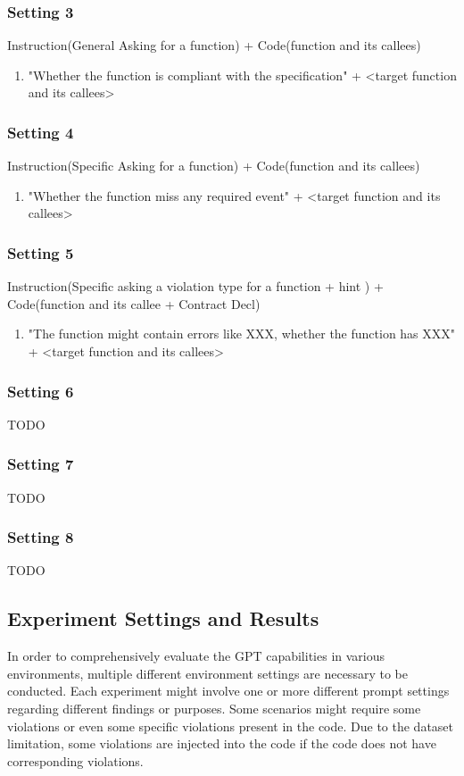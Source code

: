 \subsubsection{ Setting 3 }
Instruction(General Asking for a function) + Code(function and its callees)

\begin{enumerate}
\item "Whether the function is compliant with the specification" + <target function and its callees>
\end{enumerate}


\subsubsection{ Setting 4 }
Instruction(Specific Asking for a function) + Code(function and its callees)

\begin{enumerate}
\item "Whether the function miss any required event" + <target function and its callees>
\end{enumerate}

\subsubsection{ Setting 5 }
Instruction(Specific asking a violation type for a function + hint ) + Code(function and its callee + Contract Decl)
\begin{enumerate}
\item "The function might contain errors like XXX, whether the function has XXX" + <target function and its callees>
\end{enumerate}

\subsubsection{ Setting 6 }
TODO
\subsubsection{ Setting 7 }
TODO
\subsubsection{ Setting 8 }
TODO


\subsection{ Experiment Settings and Results }
In order to comprehensively evaluate the GPT capabilities in various environments, multiple different environment settings are necessary to be conducted. Each experiment might involve one or more different prompt settings regarding different findings or purposes. Some scenarios might require some violations or even some specific violations present in the code. Due to the dataset limitation, some violations are injected into the code if the code does not have corresponding violations.


